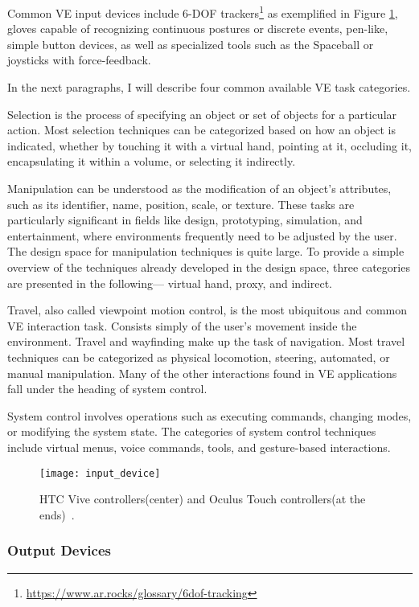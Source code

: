 Common \gls{VE} input devices include \gls{6-DOF} trackers\footnote{\url{https://www.ar.rocks/glossary/6dof-tracking}} as exemplified in Figure \ref{fig:input_device}, gloves capable of recognizing continuous postures or discrete events, pen-like, simple button devices, as well as specialized tools such as the Spaceball or joysticks with force-feedback.

In the next paragraphs, I will describe four common available VE task categories.

Selection is the process of specifying an object or set of objects for a particular action. 
Most selection techniques can be categorized based on how an object is indicated, whether
by touching it with a virtual hand, pointing at it, occluding it, encapsulating it within a volume, or 
selecting it indirectly.

Manipulation can be understood as the modification of an object’s attributes, such as its identifier, name, position, scale, or texture. These tasks are particularly significant in fields like design, prototyping, simulation, and entertainment, where environments frequently need to be adjusted by the user.
The design space for manipulation techniques is quite large. To provide a simple overview of the 
techniques already developed in the design space, three categories are presented in the following—
virtual hand, proxy, and indirect. 

Travel, also called viewpoint motion control, is the most ubiquitous and common \gls{VE} interaction 
task. Consists simply of the user's movement inside the environment. Travel and wayfinding make up the task of navigation. 
Most travel techniques can be categorized as physical locomotion, steering, automated, or manual manipulation. 
Many of the other interactions found in \gls{VE} applications fall under the heading of system control. 

System control involves operations such as executing commands, changing modes, or modifying the system state. 
The categories of system control techniques include virtual menus, voice commands, tools, and gesture-based interactions.

\begin{figure}[h!]
    \centering
    \texttt{[image: input\_device]}
    \caption{HTC Vive controllers(center) and Oculus Touch controllers(at the ends)~\cite{article_input_devices}.}
    \label{fig:input_device}
\end{figure}


\subsubsection{Output Devices}
\label{sec:output_devices}

